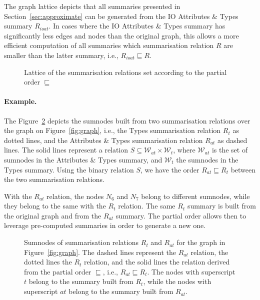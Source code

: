 \begin{remark}
The graph lattice depicts that all summaries presented in Section~\ref{sec:approximate} can be generated from the IO Attributes \& Types summary $R_{ioat}$. In cases where the IO Attributes \& Types summary has significantly less edges and nodes than the original graph, this allows a more efficient computation of all summaries which summarisation relation $R$ are smaller than the latter summary, i.e., $R_{ioat} \sqsubseteq R$.
\end{remark}

\begin{figure}
	\centering
	
	\caption{Lattice of the summarisation relations set according to the partial order $\sqsubseteq$}
	\label{fig:lattice}
\end{figure}

\paragraph{Example.}

The Figure~\ref{fig:rel-order} depicts the sumnodes built from two summarisation relations over the graph on Figure~\ref{fig:graph}, i.e., the Types summarisation relation $R_t$ as dotted lines, and the Attributes \& Types summarisation relation $R_{at}$ as dashed lines. The solid lines represent a relation $S \subseteq \mathcal{W}_{at} \times \mathcal{W}_t$, where $\mathcal{W}_{at}$ is the set of sumnodes in the Attributes \& Types summary, and $\mathcal{W}_{t}$ the sumnodes in the Types summary.
Using the binary relation $S$, we have the order $R_{at} \sqsubseteq R_t$ between the two summarisation relations.

With the $R_{at}$ relation, the nodes $N_6$ and $N_7$ belong to different sumnodes, while they belong to the same with the $R_t$ relation. The same $R_t$ summary is built from the original graph and from the $R_{at}$ summary. The partial order allows then to leverage pre-computed summaries in order to generate a new one.

\begin{figure}
	\centering
	
	\caption{Sumnodes of summarisation relations $R_t$ and $R_{at}$ for the graph in Figure~\ref{fig:graph}. The dashed lines represent the $R_{at}$ relation, the dotted lines the $R_t$ relation, and the solid lines the relation derived from the partial order $\sqsubseteq$, i.e., $R_{at} \sqsubseteq R_t$. The nodes with superscript $t$ belong to the summary built from $R_t$, while the nodes with superscript $at$ belong to the summary built from $R_{at}$.}
	\label{fig:rel-order}
\end{figure}

